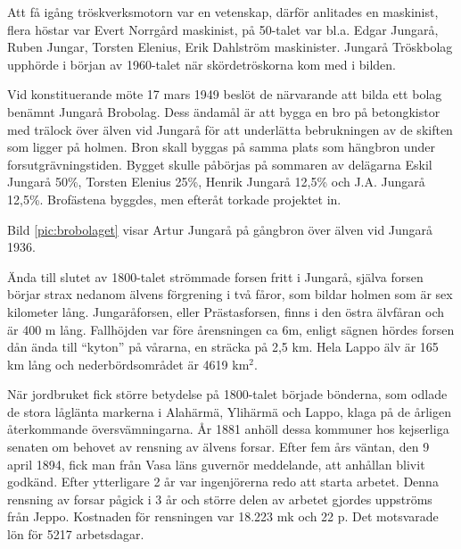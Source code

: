 Att få igång tröskverksmotorn var en vetenskap, därför anlitades en maskinist, flera höstar var Evert Norrgård maskinist, på 50-talet var bl.a. Edgar Jungarå, Ruben Jungar, Torsten Elenius, Erik Dahlström maskinister.
Jungarå Tröskbolag upphörde i början av 1960-talet när skördetröskorna kom med i bilden.





Vid konstituerande möte 17 mars 1949 beslöt de närvarande att bilda ett bolag benämnt Jungarå Brobolag. Dess ändamål är att bygga en bro på betongkistor med trälock över älven vid Jungarå för att underlätta 		 bebrukningen av de skiften som ligger på holmen. Bron skall byggas på samma plats som hängbron under  forsutgrävningstiden. Bygget skulle påbörjas på sommaren av delägarna Eskil Jungarå 50\%, Torsten Elenius 25\%, Henrik Jungarå 12,5\% och J.A. Jungarå 12,5\%. Brofästena byggdes, men efteråt torkade projektet in.

Bild \ref{pic:brobolaget} visar Artur Jungarå på gångbron över älven vid Jungarå 1936.





Ända till slutet av 1800-talet strömmade forsen fritt i Jungarå, själva forsen börjar strax nedanom älvens förgrening i två fåror, som bildar holmen som är sex kilometer lång. Jungaråforsen, eller Prästasforsen, finns i den östra älvfåran och är 400 m lång. Fallhöjden var före årensningen ca 6m, enligt sägnen hördes forsen dån ända till ``kyton'' på vårarna, en  sträcka på 	2,5 km. Hela Lappo älv är 165 km lång och nederbördsområdet är 4619 km$^2$.

När jordbruket fick större betydelse på 1800-talet började bönderna, som odlade de stora låglänta markerna i Alahärmä, Ylihärmä och Lappo, klaga på de årligen återkommande översvämningarna. År 1881 anhöll dessa kommuner hos kejserliga senaten om behovet av rensning av älvens forsar. Efter fem års väntan, den 9 april 1894, fick man från Vasa läns guvernör meddelande, att anhållan blivit godkänd. Efter ytterligare 2 år var ingenjörerna redo att starta arbetet. Denna rensning av forsar pågick i 3 år och större delen av arbetet gjordes uppströms från Jeppo. Kostnaden för rensningen var 18.223 mk och 22 p. Det motsvarade lön för 5217 arbetsdagar.

